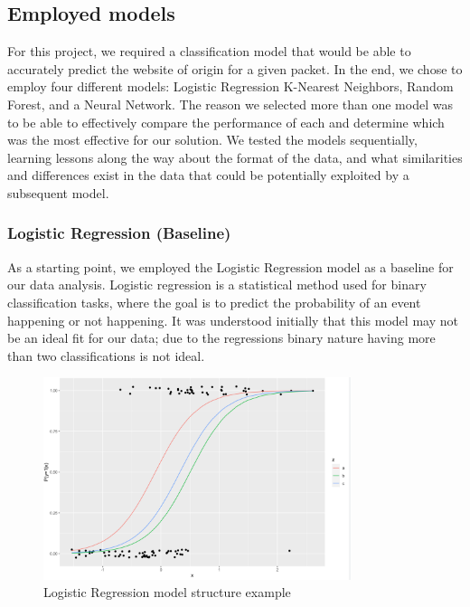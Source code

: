 \documentclass[10pt,sigconf,letterpaper,nonacm]{acmart}
\begin{document}
\subsection{Employed models}
For this project, we required a classification model that would be able to accurately predict the website of origin for a given packet. In the end, we chose to employ four different models: Logistic Regression K-Nearest Neighbors, Random Forest, and a Neural Network.
The reason we selected more than one model was to be able to effectively compare the performance of each and determine which was the most effective for our solution.
We tested the models sequentially, learning lessons along the way about the format of the data, and what similarities and differences exist in the data that could be potentially exploited by a subsequent model.

\subsubsection{Logistic Regression (Baseline)}
As a starting point, we employed the Logistic Regression model as a baseline for our data analysis. Logistic regression is a statistical method used for binary classification tasks, where the goal is to predict the probability of an event happening or not happening.
It was understood initially that this model may not be an ideal fit for our data; due to the regressions binary nature having more than two classifications is not ideal.

\begin{figure}[!h]
  \centering
  \includegraphics[width=9cm]{Figures_and_Graphs/LogReg.png}
  \caption{Logistic Regression model structure example}
  \label{fig:RFExample}
\end{figure}
\end{document}
